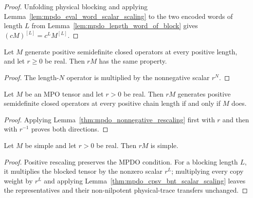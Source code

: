 \begin{proof}\leanok
    Unfolding physical blocking and applying
    Lemma~\ref{lem:mpdo_eval_word_scalar_scaling} to the two encoded words of
    length $L$ from Lemma~\ref{lem:mpdo_length_word_of_block} gives
    $(cM)^{[L]}=c^L M^{[L]}$.
\end{proof}

\begin{lemma}
    \label{thm:mpdo_nonnegative_rescaling}
    \leanok
    Let $M$ generate positive semidefinite closed operators at every positive
    length, and let $r\geq0$ be real. Then $rM$ has the same property.
\end{lemma}

\begin{proof}\leanok
    The length-$N$ operator is multiplied by the nonnegative scalar $r^N$.
\end{proof}

\begin{lemma}
    \label{thm:mpdo_positive_rescaling_iff}
    \leanok
    Let $M$ be an MPO tensor and let $r>0$ be real. Then $rM$ generates
    positive semidefinite closed operators at every positive chain length if
    and only if $M$ does.
\end{lemma}

\begin{proof}\leanok
    Applying Lemma~\ref{thm:mpdo_nonnegative_rescaling} first with $r$ and
    then with $r^{-1}$ proves both directions.
\end{proof}

\begin{lemma}
    \label{thm:mpdo_simple_positive_rescaling}
    \leanok
    Let $M$ be simple and let $r>0$ be real. Then $rM$ is simple.
\end{lemma}

\begin{proof}\leanok
    Positive rescaling preserves the MPDO condition. For a blocking length
    $L$, it multiplies the blocked tensor by the nonzero scalar $r^L$;
    multiplying every copy weight by $r^L$ and applying
    Lemma~\ref{thm:mpdo_cpsv_bnt_scalar_scaling} leaves the representatives
    and their non-nilpotent physical-trace transfers unchanged.
\end{proof}

